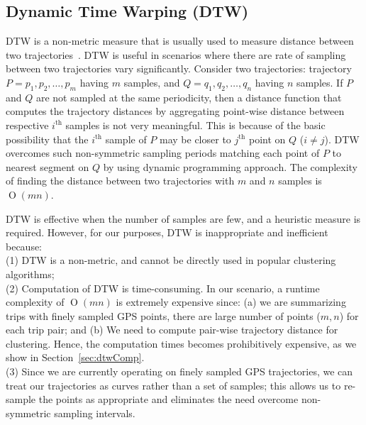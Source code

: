 \subsection{Dynamic Time Warping (DTW)}
DTW is a non-metric measure that is usually used to measure distance between two trajectories~\cite{Yi1998}. DTW is useful in scenarios where there are rate of sampling between two trajectories vary significantly. Consider two trajectories: trajectory $P={p_1, p_2,\ldots,p_m}$ having $m$ samples, and $Q={q_1, q_2,\ldots,q_n}$ having $n$ samples. If $P$ and $Q$ are not sampled at the same periodicity, then a distance function that computes the trajectory distances by aggregating point-wise distance between respective $i^\text{th}$ samples is not very meaningful. This is because of the basic possibility that the $i^\text{th}$ sample of $P$ may be closer to $j^\text{th}$ point on $Q$ ($i \neq j$). DTW overcomes such non-symmetric sampling periods matching each point of $P$ to nearest segment on $Q$ by using dynamic programming approach. The complexity of finding the distance between two trajectories with $m$ and $n$ samples is $\operatorname{O}(mn)$. 

DTW is effective when the number of samples are few, and a heuristic measure is required. However, for our purposes, DTW is inappropriate and inefficient because: 
\\\noindent(1) DTW is a non-metric, and cannot be directly used in popular clustering algorithms; 
\\\noindent(2) Computation of DTW is time-consuming. In our scenario, a runtime complexity of $\operatorname{O}(mn)$ is extremely expensive since: (a) we are summarizing trips with finely sampled GPS points, there are large number of points ($m,n$) for each trip pair; and (b) We need to compute pair-wise trajectory distance for clustering. Hence, the computation times becomes prohibitively expensive, as we show in Section~\ref{sec:dtwComp}.
\\\noindent(3) Since we are currently operating on finely sampled GPS trajectories, we can treat our trajectories as curves rather than a set of samples; this allows us to re-sample the points as appropriate and eliminates the need overcome non-symmetric sampling intervals.
